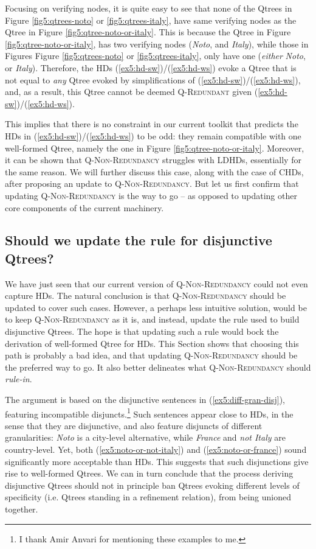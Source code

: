 Focusing on verifying nodes, it is quite easy to see that none of the Qtrees in Figure \ref{fig5:qtrees-noto} or \ref{fig5:qtrees-italy}, have same verifying nodes as the Qtree in Figure \ref{fig5:qtree-noto-or-italy}. This is because the Qtree in Figure \ref{fig5:qtree-noto-or-italy}, has two verifying nodes (\textit{Noto}, and \textit{Italy}), while those in Figures Figure \ref{fig5:qtrees-noto} or \ref{fig5:qtrees-italy}, only have one (\textit{either} \textit{Noto}, or \textit{Italy}). Therefore, the HDs (\ref{ex5:hd-sw})/(\ref{ex5:hd-ws}) evoke a Qtree that is not equal to \textit{any} Qtree evoked by simplifications of (\ref{ex5:hd-sw})/(\ref{ex5:hd-ws}), and, as a result, this Qtree cannot be deemed \textsc{Q-Redundant} given (\ref{ex5:hd-sw})/(\ref{ex5:hd-ws}).

This implies that there is no constraint in our current toolkit that predicts the HDs in (\ref{ex5:hd-sw})/(\ref{ex5:hd-ws}) to be odd: they remain compatible with one well-formed Qtree, namely the one in Figure \ref{fig5:qtree-noto-or-italy}. Moreover, it can be shown that \textsc{Q-Non-Redundancy} struggles with LDHDs, essentially for the same reason. We will further discuss this case, along with the case of CHDs, after proposing an update to \textsc{Q-Non-Redundancy}. But let us first confirm that updating \textsc{Q-Non-Redundancy} is the way to go -- as opposed to updating other core components of the current machinery.


\subsection{Should we update the rule for disjunctive Qtrees?}
We have just seen that our current version of \textsc{Q-Non-Redundancy} could not even capture HDs. The natural conclusion is that \textsc{Q-Non-Redundancy} should be updated to cover such cases. However, a perhaps less intuitive solution, would be to keep \textsc{Q-Non-Redundancy} as it is, and instead, update the rule used to build disjunctive Qtrees. The hope is that updating such a rule would bock the derivation of well-formed Qtree for HDs. This Section shows that choosing this path is probably a bad idea, and that updating \textsc{Q-Non-Redundancy} should be the preferred way to go. It also better delineates what \textsc{Q-Non-Redundancy} should \textit{rule-in}.

The argument is based on the disjunctive sentences in (\ref{ex5:diff-gran-disj}), featuring incompatible disjuncts.\footnote{I thank Amir Anvari for mentioning these examples to me.} Such sentences appear close to HDs, in the sense that they are disjunctive, and also feature disjuncts of different granularities: \textit{Noto} is a city-level alternative, while \textit{France} and \textit{not Italy} are country-level. Yet, both (\ref{ex5:noto-or-not-italy}) and (\ref{ex5:noto-or-france}) sound significantly more acceptable than HDs. This suggests that such disjunctions give rise to well-formed Qtrees. We can in turn conclude that the process deriving disjunctive Qtrees should not in principle ban Qtrees evoking different levels of specificity (i.e. Qtrees standing in a refinement relation), from being unioned together.

